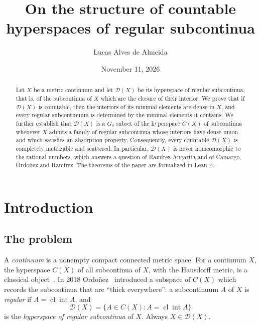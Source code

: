 \documentclass[11pt,reqno]{amsart}
\theoremstyle{plain}
\theoremstyle{definition}
\theoremstyle{remark}
\newcommand{\D}{\mathcal{D}}
\newcommand{\cl}{\operatorname{cl}}
\newcommand{\intr}{\operatorname{int}}
\begin{document}
\title[Countable hyperspaces of regular subcontinua]{On the structure of countable hyperspaces of regular subcontinua}

\author{Lucas Alves de Almeida}
\address{Independent Researcher}

\date{November 11, 2026}


\begin{abstract}
Let $X$ be a metric continuum and let $\D(X)$ be its hyperspace of regular subcontinua, that is, of the subcontinua of $X$ which are the closure of their interior. We prove that if $\D(X)$ is countable, then the interiors of its minimal elements are dense in $X$, and every regular subcontinuum is determined by the minimal elements it contains. We further establish that $\D(X)$ is a $G_\delta$ subset of the hyperspace $C(X)$ of subcontinua whenever $X$ admits a family of regular subcontinua whose interiors have dense union and which satisfies an absorption property. Consequently, every countable $\D(X)$ is completely metrizable and scattered. In particular, $\D(X)$ is never homeomorphic to the rational numbers, which answers a question of Ram\'irez Angarita and of Camargo, Ordo\~nez and Ram\'irez. The theorems of the paper are formalized in Lean~4.
\end{abstract}

\maketitle

\section{Introduction}

\subsection{The problem}
A \emph{continuum} is a nonempty compact connected metric space. For a continuum $X$, the hyperspace $C(X)$ of all subcontinua of $X$, with the Hausdorff metric, is a classical object~\cite{IN}. In 2018 Ordo\~nez~\cite{Ord18} introduced a subspace of $C(X)$ which records the subcontinua that are ``thick everywhere'': a subcontinuum $A$ of $X$ is \emph{regular} if $A=\cl\intr A$, and
\[
\D(X)=\{A\in C(X): A=\cl\intr A\}
\]
is the \emph{hyperspace of regular subcontinua} of $X$. Always $X\in\D(X)$.
\end{document}
